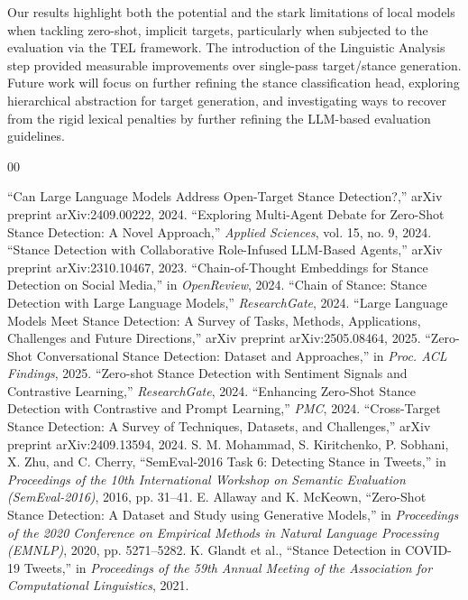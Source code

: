 \documentclass[conference]{IEEEtran}
\begin{document}
Our results highlight both the potential and the stark limitations of local models when tackling zero-shot, implicit targets, particularly when subjected to the evaluation via the TEL framework. The introduction of the Linguistic Analysis step provided measurable improvements over single-pass target/stance generation. Future work will focus on further refining the stance classification head, exploring hierarchical abstraction for target generation, and investigating ways to recover from the rigid lexical penalties by further refining the LLM-based evaluation guidelines.

\begin{thebibliography}{00}

 ``Can Large Language Models Address Open-Target Stance Detection?,'' arXiv preprint arXiv:2409.00222, 2024.
 ``Exploring Multi-Agent Debate for Zero-Shot Stance Detection: A Novel Approach,'' \textit{Applied Sciences}, vol. 15, no. 9, 2024.
 ``Stance Detection with Collaborative Role-Infused LLM-Based Agents,'' arXiv preprint arXiv:2310.10467, 2023.
 ``Chain-of-Thought Embeddings for Stance Detection on Social Media,'' in \textit{OpenReview}, 2024.
 ``Chain of Stance: Stance Detection with Large Language Models,'' \textit{ResearchGate}, 2024.
 ``Large Language Models Meet Stance Detection: A Survey of Tasks, Methods, Applications, Challenges and Future Directions,'' arXiv preprint arXiv:2505.08464, 2025.
 ``Zero-Shot Conversational Stance Detection: Dataset and Approaches,'' in \textit{Proc. ACL Findings}, 2025.
 ``Zero-shot Stance Detection with Sentiment Signals and Contrastive Learning,'' \textit{ResearchGate}, 2024.
 ``Enhancing Zero-Shot Stance Detection with Contrastive and Prompt Learning,'' \textit{PMC}, 2024.
 ``Cross-Target Stance Detection: A Survey of Techniques, Datasets, and Challenges,'' arXiv preprint arXiv:2409.13594, 2024.
 S. M. Mohammad, S. Kiritchenko, P. Sobhani, X. Zhu, and C. Cherry, ``SemEval-2016 Task 6: Detecting Stance in Tweets,'' in \textit{Proceedings of the 10th International Workshop on Semantic Evaluation (SemEval-2016)}, 2016, pp. 31--41.
 E. Allaway and K. McKeown, ``Zero-Shot Stance Detection: A Dataset and Study using Generative Models,'' in \textit{Proceedings of the 2020 Conference on Empirical Methods in Natural Language Processing (EMNLP)}, 2020, pp. 5271--5282.
 K. Glandt et al., ``Stance Detection in COVID-19 Tweets,'' in \textit{Proceedings of the 59th Annual Meeting of the Association for Computational Linguistics}, 2021.

\end{thebibliography}
\end{document}
